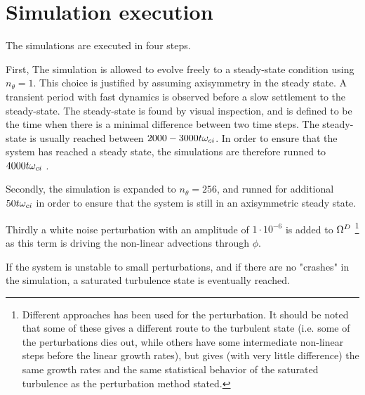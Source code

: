 \section{Simulation execution}
\label{sec:execution}
%
The simulations are executed in four steps.

First, The simulation is allowed to evolve freely to a steady-state condition using $n_\theta = 1$.
This choice is justified by assuming axisymmetry in the steady state.
A transient period with fast dynamics is observed before a slow settlement to the steady-state.
The steady-state is found by visual inspection, and is defined to be the time when there is a minimal difference between two time steps.
The steady-state is usually reached between $2000-3000t\omega_{ci}$.
In order to ensure that the system has reached a steady state, the simulations are therefore runned to $4000t\omega_{ci}$ .

Secondly, the simulation is expanded to $n_\theta = 256$, and runned for additional $50t\omega_{ci}$ in order to ensure that the system is still in an axisymmetric steady state.

Thirdly a white noise perturbation with an amplitude of $1\cdot10^{-6}$ is added to $\Omega^D$%
\footnote{Different approaches has been used for the perturbation.
    It should be noted that some of these gives a different route to the turbulent state (i.e. some of the perturbations dies out, while others have some intermediate non-linear steps before the linear growth rates), but gives (with very little difference) the same growth rates and the same statistical behavior of the saturated turbulence as the perturbation method stated.}
%
as this term is driving the non-linear advections through $\phi$.

If the system is unstable to small perturbations, and if there are no "crashes" in the simulation, a saturated turbulence state is eventually reached.

